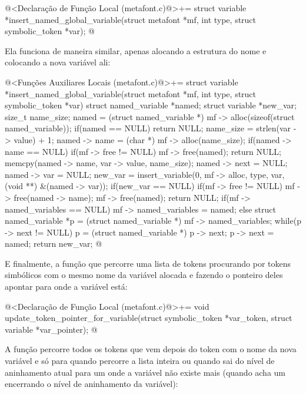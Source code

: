 \iniciocodigo
@<Declaração de Função Local (metafont.c)@>+=
struct variable *insert_named_global_variable(struct metafont *mf,
                                             int type,
                                             struct symbolic_token *var);
@
\fimcodigo

Ela funciona de maneira similar, apenas alocando a estrutura do nome e
colocando a nova variável ali:

\iniciocodigo
@<Funções Auxiliares Locais (metafont.c)@>+=
struct variable *insert_named_global_variable(struct metafont *mf,
                                             int type,
                                             struct symbolic_token *var){
  struct named_variable *named;
  struct variable *new_var;
  size_t name_size;
  named = (struct named_variable *)
              mf -> alloc(sizeof(struct named_variable));
  if(named == NULL)
    return NULL;
  name_size = strlen(var -> value) + 1;
  named -> name = (char *) mf -> alloc(name_size);
  if(named -> name == NULL){
    if(mf -> free != NULL)
      mf -> free(named);
    return NULL;
  }
  memcpy(named -> name, var -> value, name_size);
  named -> next = NULL;
  named -> var = NULL;
  new_var = insert_variable(0, mf -> alloc, type, var,
                           (void **) &(named -> var));
  if(new_var == NULL){
    if(mf -> free != NULL){
      mf -> free(named -> name);
      mf -> free(named);
      return NULL;
    }
  }
  if(mf -> named_variables == NULL)
    mf -> named_variables = named;
  else{
    struct named_variable *p = (struct named_variable *)
                                   mf -> named_variables;
    while(p -> next != NULL)
      p = (struct named_variable *) p -> next;
    p -> next = named;
  }
  return new_var;
}
@
\fimcodigo

E finalmente, a função que percorre uma lista de tokens procurando por
tokens simbólicos com o mesmo nome da variável alocada e fazendo o
ponteiro deles apontar para onde a variável está:

\iniciocodigo
@<Declaração de Função Local (metafont.c)@>+=
void update_token_pointer_for_variable(struct symbolic_token *var_token,
                                      struct variable *var_pointer);
@
\fimcodigo

A função percorre todos os tokens que vem depois do token com o nome
da nova variável e só para quando percorre a lista inteira ou quando
sai do nível de aninhamento atual para um onde a variável não existe
mais (quando acha um  encerrando o nível de
aninhamento da variável):

